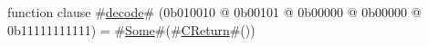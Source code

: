 function clause #\hyperref[sailMIPSzdecode]{decode}# (0b010010 @ 0b00101 @    0b00000 @    0b00000 @ 0b11111111111) = #\hyperref[sailMIPSzSome]{Some}#(#\hyperref[sailMIPSzCReturn]{CReturn}#())
